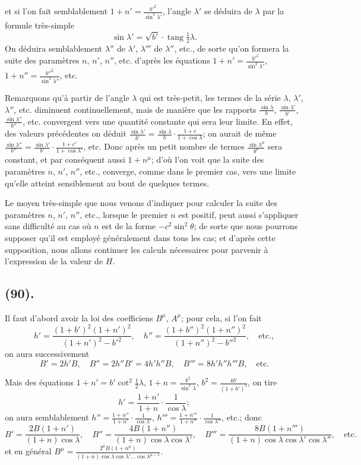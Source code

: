 \documentclass{article}
\begin{document}
et si l'on fait semblablement $1+n'=\frac{b'^{2}}{\sin^{2}\lambda'}$, l'angle $\lambda'$ se déduira de $\lambda$ par la formule très-simple
\[ \sin\lambda'=\sqrt{b'}\cdot\operatorname{tang}\tfrac{1}{2}\lambda. \]
On déduira semblablement $\lambda''$ de $\lambda'$, $\lambda'''$ de $\lambda''$, etc., de sorte qu'on formera la suite des paramètres $n$, $n'$, $n''$, etc. d'après les équations $1+n'=\frac{b'^{2}}{\sin^{2}\lambda'}$, $1+n''=\frac{b''^{2}}{\sin^{2}\lambda''}$, etc.

Remarquons qu'à partir de l'angle $\lambda$ qui est très-petit, les termes de la série $\lambda$, $\lambda'$, $\lambda''$, etc. diminuent continuellement, mais de manière que les rapports $\frac{\sin\lambda}{b}$, $\frac{\sin\lambda'}{b'}$, $\frac{\sin\lambda''}{b''}$, etc. convergent vers une quantité constante qui sera leur limite. En effet, des valeurs précédentes on déduit $\frac{\sin\lambda'}{b'}=\frac{\sin\lambda}{b}\cdot\frac{1+c}{1+\cos\lambda}$; on aurait de même $\frac{\sin\lambda''}{b''}=\frac{\sin\lambda'}{b'}\cdot\frac{1+c'}{1+\cos\lambda'}$, etc. Donc après un petit nombre de termes $\frac{\sin\lambda^{\mu}}{b^{\mu}}$ sera constant, et par conséquent aussi $1+n^{\mu}$; d'où l'on voit que la suite des paramètres $n$, $n'$, $n''$, etc., converge, comme dans le premier cas, vers une limite qu'elle atteint sensiblement au bout de quelques termes.

Le moyen très-simple que nous venons d'indiquer pour calculer la suite des paramètres $n$, $n'$, $n''$, etc., lorsque le premier $n$ est positif, peut aussi s'appliquer sans difficulté au cas où $n$ est de la forme $-c^{2}\sin^{2}\theta$; de sorte que nous pourrons supposer qu'il est employé généralement dans tous les cas; et d'après cette supposition, nous allons continuer les calculs nécessaires pour parvenir à l'expression de la valeur de $H$.

\subsection*{(90).}

Il faut d'abord avoir la loi des coefficiens $B^{\mu}$, $A^{\mu}$; pour cela, si l'on fait
\[ h'=\frac{(1+b')^{2}(1+n')^{2}}{(1+n')^{2}-b'^{2}},\quad h''=\frac{(1+b'')^{2}(1+n'')^{2}}{(1+n'')^{2}-b''^{2}},\quad\text{etc.}, \]
on aura successivement
\[ B'=2h'B,\quad B''=2h''B'=4h'h''B,\quad B'''=8h'h''h'''B,\quad\text{etc.} \]

Mais des équations $1+n'=b'\cot^{2}\frac{1}{2}\lambda$, $1+n=\frac{b^{2}}{\sin^{2}\lambda}$, $b^{2}=\frac{4b'}{(1+b')^{2}}$, on tire
\[ h'=\frac{1+n'}{1+n}\cdot\frac{1}{\cos\lambda}; \]
on aura semblablement $h''=\frac{1+n''}{1+n'}\cdot\frac{1}{\cos\lambda'}$, $h'''=\frac{1+n'''}{1+n''}\cdot\frac{1}{\cos\lambda''}$, etc.; donc
\[ B'=\frac{2B(1+n')}{(1+n)\cos\lambda},\quad B''=\frac{4B(1+n'')}{(1+n)\cos\lambda\cos\lambda'},\quad B'''=\frac{8B(1+n''')}{(1+n)\cos\lambda\cos\lambda'\cos\lambda''},\quad\text{etc.} \]
et en général $B^{\mu}=\frac{2^{\mu}B(1+n^{\mu})}{(1+n)\cos\lambda\cos\lambda'\ldots\cos\lambda^{\mu-1}}$.
\end{document}
